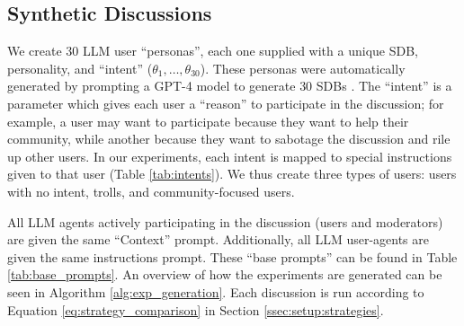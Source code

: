 \subsection{Synthetic Discussions}
\label{ssec:experimental:discussions}

We create 30 \ac{LLM} user “personas”,  each one supplied with a unique \ac{SDB}, personality, and “intent” ($\theta_1, \ldots, \theta_{30}$). These personas were automatically generated by prompting a GPT-4 model to generate $30$ \acp{SDB} \cite{openai2024gpt4technicalreport}. The “intent” is a parameter which gives each user a “reason” to participate in the discussion; for example, a user may want to participate because they want to help their community, while another because they want to sabotage the discussion and rile up other users. In our experiments, each intent is mapped to special instructions given to that user (Table \ref{tab:intents}). We thus create three types of users: users with no intent, trolls, and community-focused users.

All \ac{LLM} agents actively participating in the discussion (users and moderators) are given the same “Context” prompt. Additionally, all \ac{LLM} user-agents are given the same instructions prompt. These “base prompts” can be found in Table \ref{tab:base_prompts}. An overview of how the experiments are generated can be seen in Algorithm \ref{alg:exp_generation}. Each discussion is run according to Equation \ref{eq:strategy_comparison} in Section \ref{ssec:setup:strategies}. 

